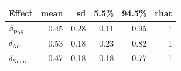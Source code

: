 
\begin{tabular}[t]{lrrrrr}
\toprule
Effect & mean & sd & 5.5\% & 94.5\% & rhat\\
\midrule
$\beta_{\text{PoS}}$ & 0.45 & 0.28 & 0.11 & 0.95 & 1\\
$\delta_{\text{Adj}}$ & 0.53 & 0.18 & 0.23 & 0.82 & 1\\
$\delta_{\text{Noun}}$ & 0.47 & 0.18 & 0.18 & 0.77 & 1\\
\bottomrule
\end{tabular}
